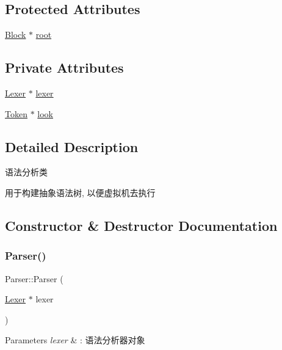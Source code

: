 \subsection*{Protected Attributes}
\begin{DoxyCompactItemize}
\item 
\hyperlink{class_block}{Block} $\ast$ \hyperlink{class_parser_a2c2aa893bb15b76ceea0330cad0c75cb}{root}
\end{DoxyCompactItemize}
\subsection*{Private Attributes}
\begin{DoxyCompactItemize}
\item 
\hyperlink{class_lexer}{Lexer} $\ast$ \hyperlink{class_parser_a8a8214126b0b0455e3ce375f3e9b20bf}{lexer}
\item 
\hyperlink{class_token}{Token} $\ast$ \hyperlink{class_parser_ac5d56e87794ceab4e8346bf4a60a5625}{look}
\end{DoxyCompactItemize}


\subsection{Detailed Description}
语法分析类 

用于构建抽象语法树, 以便虚拟机去执行 

\subsection{Constructor \& Destructor Documentation}
\mbox{\label{class_parser_a25929f4bcec5c5ff010218f001203b73}} 
\subsubsection{\texorpdfstring{Parser()}{Parser()}}
{\footnotesize\ttfamily Parser\+::\+Parser (\begin{DoxyParamCaption}\item[{\hyperlink{class_lexer}{Lexer} $\ast$}]{lexer }\end{DoxyParamCaption})}


\begin{DoxyParams}{Parameters}
{\em lexer} & \+: 语法分析器对象 \\
\hline
\end{DoxyParams}


